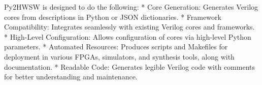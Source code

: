 %

Py2HWSW is designed to do the following:
* Core Generation: Generates Verilog cores from descriptions in Python or JSON dictionaries.
* Framework Compatibility: Integrates seamlessly with existing Verilog cores and frameworks.
* High-Level Configuration: Allows configuration of cores via high-level Python parameters.
* Automated Resources: Produces scripts and Makefiles for deployment in various FPGAs, simulators, and synthesis tools, along with documentation.
* Readable Code: Generates legible Verilog code with comments for better understanding and maintenance.
